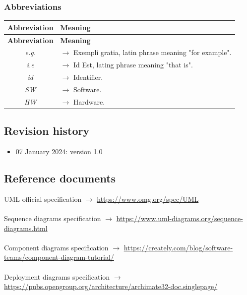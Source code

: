 \documentclass{article}
\begin{document}
{\begin{xltabular}{\textwidth}{ >{\raggedright\arraybackslash}c >{\raggedright\arraybackslash}X }
\end{xltabular}


\subsubsection{Abbreviations}
\begin{xltabular}{\textwidth}{ >{\raggedright\arraybackslash}c >{\raggedright\arraybackslash}X }
    \hline
    \textbf{Abbreviation} & \textbf{Meaning} \\
    \hline

    \endfirsthead

    \hline
    \textbf{Abbreviation} & \textbf{Meaning} \\
    \hline

    \endhead
    \endfoot
    \endlastfoot

    \textit{e.g.} & $\rightarrow$ Exempli gratia, latin phrase meaning "for example".
    \\
    \textit{i.e} & $\rightarrow$ Id Est, lating phrase meaning "that is".
    \\
    \textit{id} & $\rightarrow$ Identifier.
    \\
    \textit{SW} & $\rightarrow$ Software.
    \\
    \textit{HW} & $\rightarrow$ Hardware.
    \\
\end{xltabular}
\subsection{Revision history}
\begin{itemize}
    \item 07 January 2024: version 1.0
\end{itemize}

\subsection{Reference documents}
UML official specification $\rightarrow$ \url{https://www.omg.org/spec/UML}
\\ \\
Sequence diagrams specification $\rightarrow$ \url{https://www.uml-diagrams.org/sequence-diagrams.html}
\\ \\
Component diagrams specification $\rightarrow$ \url{https://creately.com/blog/software-teams/component-diagram-tutorial/}
\\ \\
Deployment diagrams specification $\rightarrow$ \url{https://pubs.opengroup.org/architecture/archimate32-doc.singlepage/}
}
\end{document}
